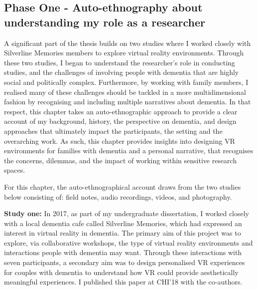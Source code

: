 \subsection{Phase One - Auto-ethnography about understanding my role as a researcher}

A significant part of the thesis builds on two studies where I worked closely with Silverline Memories members to explore virtual reality environments. Through these two studies, I began to understand the researcher's role in conducting studies, and the challenges of involving people with dementia that are highly social and politically complex. Furthermore, by working with family members, I realised many of these challenges should be tackled in a more multidimensional fashion by recognising and including multiple narratives about dementia. In that respect, this chapter takes an auto-ethnographic approach to provide a clear account of my background, history, the perspective on dementia, and design approaches that ultimately impact the participants, the setting and the overarching work. As such, this chapter provides insights into designing VR environments for families with dementia and a personal narrative, that recognises the concerns, dilemmas, and the impact of working within sensitive research spaces. 

For this chapter, the auto-ethnographical account draws from the two studies below consisting of: field notes, audio recordings, videos, and photography. 

\textbf{Study one:} In 2017, as part of my undergraduate dissertation, I worked closely with a local dementia cafe called Silverline Memories, which had expressed an interest in virtual reality in dementia. The primary aim of this project was to explore, via collaborative workshops, the type of virtual reality environments and interactions people with dementia may want. Through these interactions with seven participants, a secondary aim was to design personalised VR experiences for couples with dementia to understand how VR could provide aesthetically meaningful experiences. I published this paper at CHI'18 with the co-authors.

